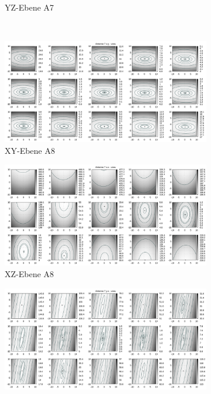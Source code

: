 \begin{appendix}
\begin{landscape}
\begin{figure}[!ht]
\begin{subfigure}[t]{0.5\textwidth}
				\caption{YZ-Ebene A7}
	\end{subfigure}
\\
	\centering
	\begin{subfigure}[t]{0.5\textwidth}
	     \centering
	     \includegraphics[width=\textwidth]{img/fitness/xy/a7.png}
	             \caption{XY-Ebene A8}
	\end{subfigure}
	\begin{subfigure}[t]{0.5\textwidth}
		\centering
	     \includegraphics[width=\textwidth]{img/fitness/xz/a7.png}
				\caption{XZ-Ebene A8}
	\end{subfigure}
	\begin{subfigure}[t]{0.5\textwidth}
			\centering
	   \includegraphics[width=\textwidth]{img/fitness/yz/a7.png}

\end{subfigure}
\end{figure}
\end{landscape}
\end{appendix}
